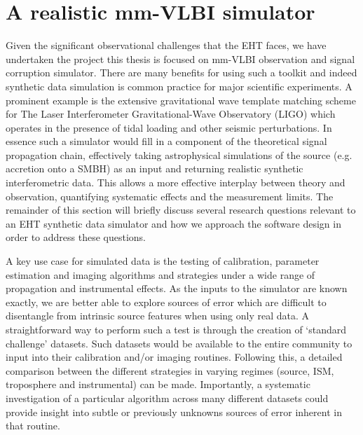 \section{A realistic mm-VLBI simulator}

Given the significant observational challenges that the EHT faces, we have undertaken the project this thesis is focused on mm-VLBI observation and signal corruption simulator. There are many benefits for using such a toolkit and indeed synthetic data simulation is common practice for major scientific experiments. A prominent example is the extensive gravitational wave template matching scheme for The Laser Interferometer Gravitational-Wave Observatory (LIGO) which operates in the presence of tidal loading and other seismic perturbations. In essence such a simulator would fill in a component of the theoretical signal propagation chain, effectively taking astrophysical simulations of the source (e.g. accretion onto a SMBH) as an input and returning realistic synthetic interferometric data. This allows a more effective interplay between theory and observation, quantifying systematic effects and the measurement limits. The remainder of this section will briefly discuss several research questions relevant to an EHT synthetic data simulator and how we approach the software design in order to address these questions. 


A key use case for simulated data is the testing of calibration, parameter estimation and imaging algorithms and strategies under a wide range of propagation and instrumental effects. As the inputs to the simulator are known exactly, we are better able to explore sources of error which are difficult to disentangle from intrinsic source features when using only real data. A straightforward way to perform such a test is through the creation of `standard challenge' datasets. Such datasets would be available to the entire community to input into their calibration and/or imaging routines. Following this, a detailed comparison between the different strategies in varying regimes (source, ISM, troposphere and instrumental) can be made. Importantly, a systematic investigation of a particular algorithm across many different datasets could provide insight into subtle or previously unknowns sources of error inherent in that routine.


